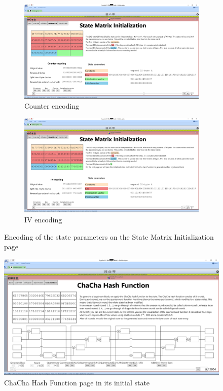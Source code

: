 \begin{figure}
\ContinuedFloat
\begin{subfigure}{\textwidth}
  \centering
  \includegraphics[width=\textwidth]{figures/ct2/state-matrix/3-state-matrix-counter.png}
  \caption{Counter encoding}
  \label{fig:statematrix.encoding.counter}
\end{subfigure}
\begin{subfigure}{\textwidth}
  \centering
  \includegraphics[width=\textwidth]{figures/ct2/state-matrix/4-state-matrix-iv.png}
  \caption{IV encoding}
  \label{fig:statematrix.encoding.iv}
\end{subfigure}
\caption[State Matrix Initialization page]{Encoding of the state parameters on the State Matrix Initialization page}
\label{fig:statematrix.encoding}
\end{figure}

\FloatBarrier

\begin{figure}[h]
\centering
\includegraphics[width=\textwidth]{figures/ct2/all-pages/5-chachahash.png}
\caption{ChaCha Hash Function page in its initial state}
\label{fig:chachahashpage}
\end{figure}

